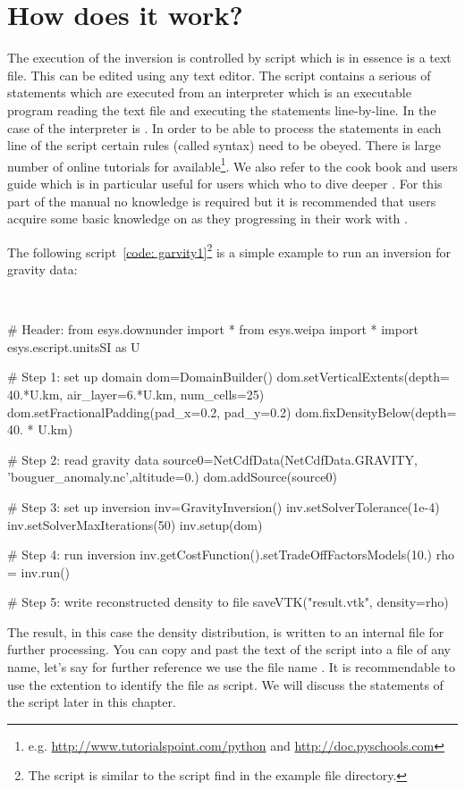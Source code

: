 \section{How does it work?}
The execution of the inversion is controlled by script which is in essence is a text file. This can be edited using any 
text editor. The script contains a serious of statements which are executed from an interpreter which
is an executable program reading the text file and executing the statements line-by-line. In the case 
of \downunder the interpreter is \python. In order to be able to process the statements in each line of the script
certain rules (called syntax) need to be obeyed. There is large number of online tutorials for \python 
available\footnote{e.g. \url{http://www.tutorialspoint.com/python} and \url{http://doc.pyschools.com}}. We also 
refer to the \escript cook book \cite{ESCRIPTCOOKBOOK} and users guide \cite{ESCRIPT} which is in particular useful for users which who to dive deeper
\downunder. For this part of the manual no \python knowledge is required but it is recommended that 
users acquire some basic knowledge on \python as they progressing in their work with \downunder.

The following script~\ref{code: garvity1}\footnote{The script is similar to the  script
find in the \escript example file directory.} is a simple example to run an inversion for gravity data: 
\begin{pyc}
\
\begin{verbatim*}
# Header:
from esys.downunder import *
from esys.weipa import *
import esys.escript.unitsSI as U

# Step 1: set up domain
dom=DomainBuilder()
dom.setVerticalExtents(depth= 40.*U.km, air_layer=6.*U.km, num_cells=25)
dom.setFractionalPadding(pad_x=0.2, pad_y=0.2)
dom.fixDensityBelow(depth= 40. * U.km)

# Step 2: read gravity data
source0=NetCdfData(NetCdfData.GRAVITY, 'bouguer_anomaly.nc',altitude=0.)
dom.addSource(source0)

# Step 3: set up inversion
inv=GravityInversion()
inv.setSolverTolerance(1e-4)
inv.setSolverMaxIterations(50)
inv.setup(dom)

# Step 4: run inversion 
inv.getCostFunction().setTradeOffFactorsModels(10.) 
rho = inv.run()

# Step 5: write reconstructed density to file
saveVTK("result.vtk", density=rho)
\end{verbatim*}\label{code: garvity1}
\end{pyc}
The result, in this
case the density distribution, is written to an internal file for further processing. You can copy and past the text of the 
script into a file of any name, let's say for further reference we use the file name \file{grav.py}. It is recommendable
to use the extention \file{py} to identify the file as \python script. We will discuss the statements
of the script later in this chapter. 

